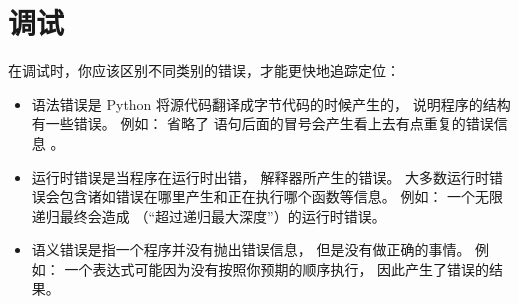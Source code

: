 

\chapter{调试}



在调试时，你应该区别不同类别的错误，才能更快地追踪定位：

\begin{itemize}


\item 语法错误是 Python 将源代码翻译成字节代码的时候产生的， 说明程序的结构有一些错误。
例如： 省略了  语句后面的冒号会产生看上去有点重复的错误信息  。


\item 运行时错误是当程序在运行时出错， 解释器所产生的错误。
大多数运行时错误会包含诸如错误在哪里产生和正在执行哪个函数等信息。
例如： 一个无限递归最终会造成  （``超过递归最大深度''）的运行时错误。


\item 语义错误是指一个程序并没有抛出错误信息， 但是没有做正确的事情。
例如： 一个表达式可能因为没有按照你预期的顺序执行， 因此产生了错误的结果。

\end{itemize}

